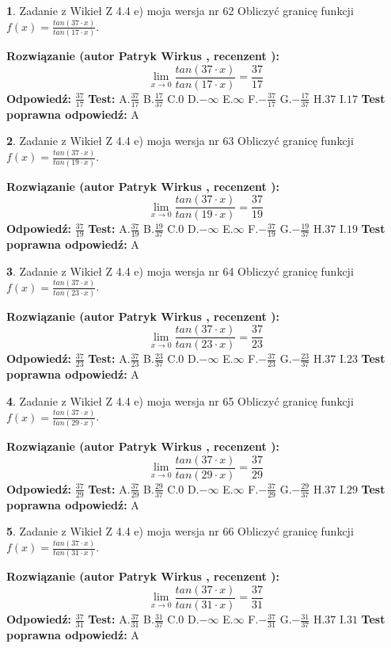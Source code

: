 \documentclass[12pt, a4paper]{article}
\theoremstyle{definition} %
\newtheorem{zad}{}
\newcommand{\zadStart}[1]{\begin{zad}#1\newline}
\newcommand{\zadStop}{\end{zad}}
\newcommand{\rozwStart}[2]{\noindent \textbf{Rozwiązanie (autor #1 , recenzent #2): }\newline}
\newcommand{\rozwStop}{\newline}
\newcommand{\odpStart}{\noindent \textbf{Odpowiedź:}\newline}
\newcommand{\odpStop}{\newline}
\newcommand{\testStart}{\noindent \textbf{Test:}\newline}
\newcommand{\testStop}{\newline}
\newcommand{\kluczStart}{\noindent \textbf{Test poprawna odpowiedź:}\newline}
\newcommand{\kluczStop}{\newline}
\begin{document}
\zadStart{Zadanie z Wikieł Z 4.4 e) moja wersja nr 62}
Obliczyć granicę funkcji $f(x)=\frac{tan(37\cdot x)}{tan(17\cdot x)}$.
\zadStop
\rozwStart{Patryk Wirkus}{}
$$\lim\limits_{x\to 0}\frac{tan(37\cdot x)}{tan(17\cdot x)}=
\frac{37}{17}$$
\rozwStop
\odpStart
$\frac{37}{17}$
\odpStop
\testStart
A.$\frac{37}{17}$
B.$\frac{17}{37}$
C.$0$
D.$-\infty$
E.$\infty$
F.$-\frac{37}{17}$
G.$-\frac{17}{37}$
H.$37$
I.$17$
\testStop
\kluczStart
A
\kluczStop



\zadStart{Zadanie z Wikieł Z 4.4 e) moja wersja nr 63}
Obliczyć granicę funkcji $f(x)=\frac{tan(37\cdot x)}{tan(19\cdot x)}$.
\zadStop
\rozwStart{Patryk Wirkus}{}
$$\lim\limits_{x\to 0}\frac{tan(37\cdot x)}{tan(19\cdot x)}=
\frac{37}{19}$$
\rozwStop
\odpStart
$\frac{37}{19}$
\odpStop
\testStart
A.$\frac{37}{19}$
B.$\frac{19}{37}$
C.$0$
D.$-\infty$
E.$\infty$
F.$-\frac{37}{19}$
G.$-\frac{19}{37}$
H.$37$
I.$19$
\testStop
\kluczStart
A
\kluczStop



\zadStart{Zadanie z Wikieł Z 4.4 e) moja wersja nr 64}
Obliczyć granicę funkcji $f(x)=\frac{tan(37\cdot x)}{tan(23\cdot x)}$.
\zadStop
\rozwStart{Patryk Wirkus}{}
$$\lim\limits_{x\to 0}\frac{tan(37\cdot x)}{tan(23\cdot x)}=
\frac{37}{23}$$
\rozwStop
\odpStart
$\frac{37}{23}$
\odpStop
\testStart
A.$\frac{37}{23}$
B.$\frac{23}{37}$
C.$0$
D.$-\infty$
E.$\infty$
F.$-\frac{37}{23}$
G.$-\frac{23}{37}$
H.$37$
I.$23$
\testStop
\kluczStart
A
\kluczStop



\zadStart{Zadanie z Wikieł Z 4.4 e) moja wersja nr 65}
Obliczyć granicę funkcji $f(x)=\frac{tan(37\cdot x)}{tan(29\cdot x)}$.
\zadStop
\rozwStart{Patryk Wirkus}{}
$$\lim\limits_{x\to 0}\frac{tan(37\cdot x)}{tan(29\cdot x)}=
\frac{37}{29}$$
\rozwStop
\odpStart
$\frac{37}{29}$
\odpStop
\testStart
A.$\frac{37}{29}$
B.$\frac{29}{37}$
C.$0$
D.$-\infty$
E.$\infty$
F.$-\frac{37}{29}$
G.$-\frac{29}{37}$
H.$37$
I.$29$
\testStop
\kluczStart
A
\kluczStop



\zadStart{Zadanie z Wikieł Z 4.4 e) moja wersja nr 66}
Obliczyć granicę funkcji $f(x)=\frac{tan(37\cdot x)}{tan(31\cdot x)}$.
\zadStop
\rozwStart{Patryk Wirkus}{}
$$\lim\limits_{x\to 0}\frac{tan(37\cdot x)}{tan(31\cdot x)}=
\frac{37}{31}$$
\rozwStop
\odpStart
$\frac{37}{31}$
\odpStop
\testStart
A.$\frac{37}{31}$
B.$\frac{31}{37}$
C.$0$
D.$-\infty$
E.$\infty$
F.$-\frac{37}{31}$
G.$-\frac{31}{37}$
H.$37$
I.$31$
\testStop
\kluczStart
A
\kluczStop
\end{document}
